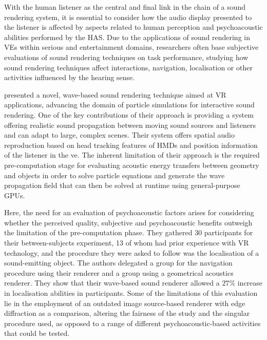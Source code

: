 With the human listener as the central and final link in the chain of a sound rendering system, it is essential to consider how the audio display presented to the listener is affected by aspects related to human perception and psychoacoustic abilities performed by the HAS. Due to the applications of sound rendering in VEs within serious and entertainment domains, researchers often base subjective evaluations of sound rendering techniques on task performance, studying how sound rendering techniques affect interactions, navigation, localisation or other activities influenced by the hearing sense.\par
\cite{mehra2015wave} presented a novel, wave-based sound rendering technique aimed at VR applications, advancing the domain of particle simulations for interactive sound rendering. One of the key contributions of their approach is providing a system offering realistic sound propagation between moving sound sources and listeners and can adapt to large, complex scenes. Their system offers spatial audio reproduction based on head tracking features of HMDs and position information of the listener in the \acrshort{ve}. The inherent limitation of their approach is the required pre-computation stage for evaluating acoustic energy transfers between geometry and objects in order to solve particle equations and generate the wave propagation field that can then be solved at runtime using general-purpose GPUs.

Here, the need for an evaluation of psychoacoustic factors arises for considering whether the perceived quality, subjective and psychoacoustic benefits outweigh the limitation of the pre-computation phase. They gathered 30 participants for their between-subjects experiment, 13 of whom had prior experience with VR technology, and the procedure they were asked to follow was the localisation of a sound-emitting object. The authors delegated a group for the navigation procedure using their renderer and a group using a geometrical acoustics renderer. They show that their wave-based sound renderer allowed a $27\%$ increase in localisation abilities in participants. Some of the limitations of this evaluation lie in the employment of an outdated image source-based renderer with edge diffraction as a comparison, altering the fairness of the study and the singular procedure used, as opposed to a range of different psychoacoustic-based activities that could be tested.\par

